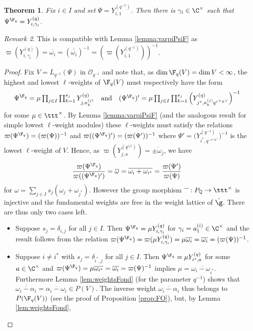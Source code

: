 \documentclass[11pt]{amsart}
\newtheorem{theorem}{Theorem}[section]
\theoremstyle{definition}
\theoremstyle{remark}
\newtheorem{rem}[theorem]{Remark}
\numberwithin{equation}{section}
\begin{document}
\begin{theorem}\label{thm:FondF} Fix $i\in I$ and set $\Psi = Y_{i,1}^{(q^{-1})}$. Then there is $\gamma_{i} \in \C^{\times}$ such that $\Psi^{\F_q} = Y_{i,\gamma_i}^{(q)}$.
\end{theorem}
\begin{rem} This is compatible with Lemma \ref{lemma:varpiPsiF} as $\varpi(Y_{i,\gamma_i}^{(q)}) = \overline{\omega_i}= (\overline{\overline{\omega_i}})^{-1} = (\varpi(Y_{i,1}^{(q^{-1})}))^{-1}$.
\end{rem}
\begin{proof}
Fix $V = L_{q^{-1}}(\Psi)$ in $\mathcal{O}_{q^{-1}}$ and note that, as $\dim \F_q(V) = \dim V < \infty$, the highest and lowest $\ell$-weights of $\F_q(V)$ must respectively have the form
$$\Psi^{\F_q} = \mu\textstyle \prod_{j\in I}\prod_{k=1}^{s_j} Y_{j,a_k^{(j)}}^{(q)} \quad \text{and} \quad \textstyle (\Psi^{\F_q})' = \mu \prod_{j\in I}\prod_{k=1}^{s_j} \Big(Y_{j^*,a_k^{(j)}q^{r^{\vee}h^{\vee}}}^{(q)}\Big)^{-1}$$
for some
 $\mu\in \ttt^{\times}$.
By Lemma \ref{lemma:varpiPsiF} (and the analogous result for simple lowest $\ell$-weight modules) these $\ell$-weights must satisfy the relations $\varpi(\Psi^{\F_q}) = (\varpi(\Psi))^{-1}$ and $\varpi((\Psi^{\F_q})') = (\varpi(\Psi'))^{-1}$ where $\Psi' = \Big(Y_{i^*,q^{-r^{\vee}h^{\vee}}}^{(q^{-1})}\Big)^{-1}$ is the lowest $\ell$-weight of $V$. Hence, as $\varpi(Y_{j,a}^{(q^{\pm 1})}) = \overline{\pm\omega_j}$, we have 
$$ \frac{\varpi(\Psi^{\F_q})}{\varpi((\Psi^{\F_q})')} = \overline{\omega} = \overline{\omega_i+\omega_{i^{*}}}=\frac{\varpi(\Psi')}{\varpi(\Psi)}$$
for $\omega = \sum_{j\in I}s_j(\omega_j+\omega_{j^*})$. However the group morphism $\overline{\textcolor{white}{\alpha}}:P_{\mathbb{Q}}\rightarrow \ttt^{\times}$ is injective and the fundamental weights are free in the weight lattice of $\dot{\g}$. There are thus only two cases left.
\begin{itemize}
\item[(Case 1)] Suppose $s_j = \delta_{i,j}$ for all $j\in I$. Then $\Psi^{\F_q} = \mu Y_{i,\gamma_i}^{(q)}$ for $\gamma_i = a_1^{(i)}\in \C^{\times}$ and the result follows from the relation $\varpi(\Psi^{\F_q}) = \varpi(\mu Y_{i,\gamma_i}^{(q)}) = \mu \overline{\omega_i} = \overline{\omega_i} = (\varpi(\Psi))^{-1}$.
\item[(Case 2)] Suppose $i\neq i^*$ with $s_j = \delta_{i^*,j}$ for all $j\in I$. Then $\Psi^{\F_q} = \mu Y_{i^*,a}^{(q)}$ for some $a\in \C^{\times}$ and $\varpi(\Psi^{\F_q}) = \mu \overline{\omega_{i^*}} = \overline{\omega_i} = \varpi(\Psi)^{-1}$ implies $\mu = \overline{\omega_i-\omega_{i^*}}$. Furthermore Lemma \ref{lem:weightsFond} (for the parameter $q^{-1}$) shows that $\overline{\overline{\omega_i-\alpha_i}} = \overline{\alpha_i-\omega_i} \in P(V)$. The inverse weight $\overline{\omega_i-\alpha_i}$ thus belongs to $P(\F_q(V))$ (see the proof of Proposition \ref{prop:FO}), but, by Lemma \ref{lem:weightsFond}, 

\end{itemize}
\end{proof}
\end{document}
